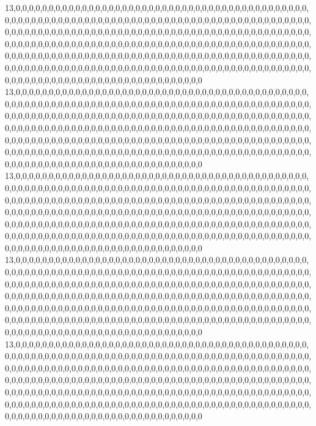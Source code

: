 13,0,0,0,0,0,0,0,0,0,0,0,0,0,0,0,0,0,0,0,0,0,0,0,0,0,0,0,0,0,0,0,0,0,0,0,0,0,0,0,0,0,0,0,0,0,0,0,0,0,0,0,0,0,0,0,0,0,0,0,0,0,0,0,0,0,0,0,0,0,0,0,0,0,0,0,0,0,0,0,0,0,0,0,0,0,0,0,0,0,0,0,0,0,0,0,0,0,0,0,0,0,0,0,0,0,0,0,0,0,0,0,0,0,0,0,0,0,0,0,0,0,0,0,0,0,0,0,0,0,0,0,0,0,0,0,0,0,0,0,0,0,0,0,0,0,0,0,0,0,0,0,0,0,0,0,0,0,0,0,0,0,0,0,0,0,0,0,0,0,0,0,0,0,0,0,0,0,0,0,0,0,0,0,0,0,0,0,0,0,0,0,0,0,0,0,0,0,0,0,0,0,0,0,0,0,0,0,0,0,0,0,0,0,0,0,0,0,0,0,0,0,0,0,0,0,0,0,0,0,0,0,0,0,0,0,0,0,0,0,0,0,0,0,0,0,0,0,0,0,0,0,0,0,0,0,0,0,0,0,0,0,0,0,0,0,0,0,0,0,0,0,0,0,0,0,0,0,0,0,0,0,0,0,0,0,0,0,0,0,0,0,0,0,0,0,0,0,0,0,0,0,0,0,0
13,0,0,0,0,0,0,0,0,0,0,0,0,0,0,0,0,0,0,0,0,0,0,0,0,0,0,0,0,0,0,0,0,0,0,0,0,0,0,0,0,0,0,0,0,0,0,0,0,0,0,0,0,0,0,0,0,0,0,0,0,0,0,0,0,0,0,0,0,0,0,0,0,0,0,0,0,0,0,0,0,0,0,0,0,0,0,0,0,0,0,0,0,0,0,0,0,0,0,0,0,0,0,0,0,0,0,0,0,0,0,0,0,0,0,0,0,0,0,0,0,0,0,0,0,0,0,0,0,0,0,0,0,0,0,0,0,0,0,0,0,0,0,0,0,0,0,0,0,0,0,0,0,0,0,0,0,0,0,0,0,0,0,0,0,0,0,0,0,0,0,0,0,0,0,0,0,0,0,0,0,0,0,0,0,0,0,0,0,0,0,0,0,0,0,0,0,0,0,0,0,0,0,0,0,0,0,0,0,0,0,0,0,0,0,0,0,0,0,0,0,0,0,0,0,0,0,0,0,0,0,0,0,0,0,0,0,0,0,0,0,0,0,0,0,0,0,0,0,0,0,0,0,0,0,0,0,0,0,0,0,0,0,0,0,0,0,0,0,0,0,0,0,0,0,0,0,0,0,0,0,0,0,0,0,0,0,0,0,0,0,0,0,0,0,0,0,0,0,0,0,0,0,0,0
13,0,0,0,0,0,0,0,0,0,0,0,0,0,0,0,0,0,0,0,0,0,0,0,0,0,0,0,0,0,0,0,0,0,0,0,0,0,0,0,0,0,0,0,0,0,0,0,0,0,0,0,0,0,0,0,0,0,0,0,0,0,0,0,0,0,0,0,0,0,0,0,0,0,0,0,0,0,0,0,0,0,0,0,0,0,0,0,0,0,0,0,0,0,0,0,0,0,0,0,0,0,0,0,0,0,0,0,0,0,0,0,0,0,0,0,0,0,0,0,0,0,0,0,0,0,0,0,0,0,0,0,0,0,0,0,0,0,0,0,0,0,0,0,0,0,0,0,0,0,0,0,0,0,0,0,0,0,0,0,0,0,0,0,0,0,0,0,0,0,0,0,0,0,0,0,0,0,0,0,0,0,0,0,0,0,0,0,0,0,0,0,0,0,0,0,0,0,0,0,0,0,0,0,0,0,0,0,0,0,0,0,0,0,0,0,0,0,0,0,0,0,0,0,0,0,0,0,0,0,0,0,0,0,0,0,0,0,0,0,0,0,0,0,0,0,0,0,0,0,0,0,0,0,0,0,0,0,0,0,0,0,0,0,0,0,0,0,0,0,0,0,0,0,0,0,0,0,0,0,0,0,0,0,0,0,0,0,0,0,0,0,0,0,0,0,0,0,0,0,0,0,0,0,0
13,0,0,0,0,0,0,0,0,0,0,0,0,0,0,0,0,0,0,0,0,0,0,0,0,0,0,0,0,0,0,0,0,0,0,0,0,0,0,0,0,0,0,0,0,0,0,0,0,0,0,0,0,0,0,0,0,0,0,0,0,0,0,0,0,0,0,0,0,0,0,0,0,0,0,0,0,0,0,0,0,0,0,0,0,0,0,0,0,0,0,0,0,0,0,0,0,0,0,0,0,0,0,0,0,0,0,0,0,0,0,0,0,0,0,0,0,0,0,0,0,0,0,0,0,0,0,0,0,0,0,0,0,0,0,0,0,0,0,0,0,0,0,0,0,0,0,0,0,0,0,0,0,0,0,0,0,0,0,0,0,0,0,0,0,0,0,0,0,0,0,0,0,0,0,0,0,0,0,0,0,0,0,0,0,0,0,0,0,0,0,0,0,0,0,0,0,0,0,0,0,0,0,0,0,0,0,0,0,0,0,0,0,0,0,0,0,0,0,0,0,0,0,0,0,0,0,0,0,0,0,0,0,0,0,0,0,0,0,0,0,0,0,0,0,0,0,0,0,0,0,0,0,0,0,0,0,0,0,0,0,0,0,0,0,0,0,0,0,0,0,0,0,0,0,0,0,0,0,0,0,0,0,0,0,0,0,0,0,0,0,0,0,0,0,0,0,0,0,0,0,0,0,0,0
13,0,0,0,0,0,0,0,0,0,0,0,0,0,0,0,0,0,0,0,0,0,0,0,0,0,0,0,0,0,0,0,0,0,0,0,0,0,0,0,0,0,0,0,0,0,0,0,0,0,0,0,0,0,0,0,0,0,0,0,0,0,0,0,0,0,0,0,0,0,0,0,0,0,0,0,0,0,0,0,0,0,0,0,0,0,0,0,0,0,0,0,0,0,0,0,0,0,0,0,0,0,0,0,0,0,0,0,0,0,0,0,0,0,0,0,0,0,0,0,0,0,0,0,0,0,0,0,0,0,0,0,0,0,0,0,0,0,0,0,0,0,0,0,0,0,0,0,0,0,0,0,0,0,0,0,0,0,0,0,0,0,0,0,0,0,0,0,0,0,0,0,0,0,0,0,0,0,0,0,0,0,0,0,0,0,0,0,0,0,0,0,0,0,0,0,0,0,0,0,0,0,0,0,0,0,0,0,0,0,0,0,0,0,0,0,0,0,0,0,0,0,0,0,0,0,0,0,0,0,0,0,0,0,0,0,0,0,0,0,0,0,0,0,0,0,0,0,0,0,0,0,0,0,0,0,0,0,0,0,0,0,0,0,0,0,0,0,0,0,0,0,0,0,0,0,0,0,0,0,0,0,0,0,0,0,0,0,0,0,0,0,0,0,0,0,0,0,0,0,0,0,0,0,0
